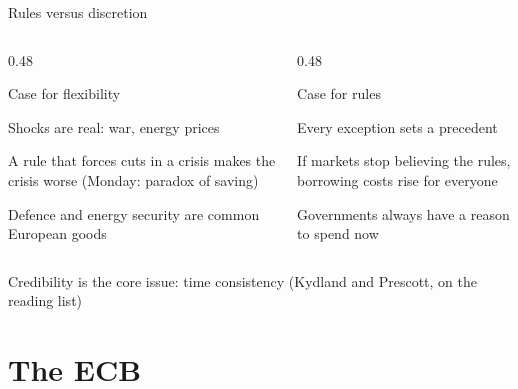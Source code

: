 \documentclass[aspectratio=169,xcolor=table]{beamer}
\begin{document}
\begin{frame}{Rules versus discretion}
\footnotesize
\begin{columns}[T]
\begin{column}{0.48\textwidth}
\begin{alertblock}{Case for flexibility}
\bi
  \item Shocks are real: war, energy prices
  \item A rule that forces cuts in a crisis makes the crisis worse (Monday: paradox of saving)
  \item Defence and energy security are common European goods
\ei
\end{alertblock}
\end{column}
\begin{column}{0.48\textwidth}
\begin{block}{Case for rules}
\bi
  \item Every exception sets a precedent
  \item If markets stop believing the rules, borrowing costs rise for everyone
  \item Governments always have a reason to spend now
\ei
\end{block}
\end{column}
\end{columns}
\vspace{0.15cm}
\begin{block}{}
\centering Credibility is the core issue: time consistency (Kydland and Prescott, on the reading list)
\end{block}
\end{frame}

\section{The ECB}
\end{document}
